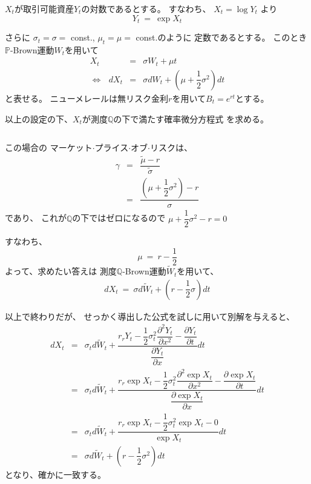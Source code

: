 \documentclass[uplatex,a4j,12pt,dvipdfmx]{jsarticle}
\begin{document}
$X_{t}$が取引可能資産$Y_{t}$の対数であるとする。
すなわち、
$
	X_{t}
	=
	\log Y_{t}
$
より
$$
	Y_{t}
	\ = \
	\exp X_{t}
$$

さらに
$\sigma_{t} = \sigma = $ const.,
$\mu_{t} = \mu = $ const.のように
定数であるとする。
このとき$\mathbb{P}$-Brown運動$W_{t}$を用いて
%
%
\begin{eqnarray*}
	X_{t}
	&=&
	\sigma W_{t} + \mu t
	\\
	\Longleftrightarrow
	\ \ \
	dX_{t}
	&=&
	\sigma dW_{t} + \left( \mu + \dfrac{1}{2} \sigma^{2} \right) dt
\end{eqnarray*}
%
%
と表せる。
ニューメレールは無リスク金利$r$を用いて$B_{t} = e^{rt}$とする。

以上の設定の下、$X_{t}$が測度$\mathbb{Q}$の下で満たす確率微分方程式
を求める。

${}$

この場合の
マーケット$\cdot$プライス$\cdot$オブ$\cdot$リスクは、
%
%
\begin{eqnarray*}
	\gamma
	&=&
	\dfrac{ \tilde{\mu} - r }{ \tilde{\sigma} }
	\\ &=&
	\dfrac{ \left( \mu + \dfrac{1}{2} \sigma^{2} \right) - r }{ \sigma }
\end{eqnarray*}
%
%
であり、
これが$\mathbb{Q}$の下ではゼロになるので
$\mu + \dfrac{1}{2} \sigma^{2} - r = 0$

すなわち、
$$
	\mu
	\ = \
	r - \dfrac{1}{2}
$$
よって、求めたい答えは
測度$\mathbb{Q}$-Brown運動$\tilde{W}_{t}$を用いて、
%
%
\begin{eqnarray*}
	dX_{t}
	\ = \
	\sigma d \tilde{W}_{t} + \left( r - \dfrac{1}{2} \sigma \right) dt
\end{eqnarray*}
%
%

以上で終わりだが、
せっかく導出した公式を試しに用いて別解を与えると、
%
%
\begin{eqnarray*}
	dX_{t}
	&=&
	\sigma_{t} d \tilde{W}_{t}
	+
	\dfrac{
		r_{r} Y_{t}
		-
		\dfrac{1}{2}
		\sigma_{t}^{2}
		\dfrac{ \partial^{2} Y_{t} }{ \partial x^{2} }
		-
		\dfrac{ \partial Y_{t} }{ \partial t }
	}
	{
		\dfrac{ \partial Y_{t} }{ \partial x }
	}
	dt
	\\[3mm] &=&
	\sigma_{t} d \tilde{W}_{t}
	+
	\dfrac{
		r_{r} \exp X_{t}
		-
		\dfrac{1}{2}
		\sigma_{t}^{2}
		\dfrac{ \partial^{2} \exp X_{t} }{ \partial x^{2} }
		-
		\dfrac{ \partial \exp X_{t} }{ \partial t }
	}
	{
		\dfrac{ \partial \exp X_{t} }{ \partial x }
	}
	dt
	\\[2mm] &=&
	\sigma_{t} d \tilde{W}_{t}
	+
	\dfrac{
		r_{r} \exp X_{t}
		-
		\dfrac{1}{2}
		\sigma_{t}^{2}
		\exp X_{t}
		-
		0
	}
	{
		\exp X_{t}
	}
	dt
	\\ &=&
	\sigma d \tilde{W}_{t} + \left( r - \dfrac{1}{2} \sigma^{2} \right) dt
\end{eqnarray*}
%
%
となり、確かに一致する。
\end{document}
